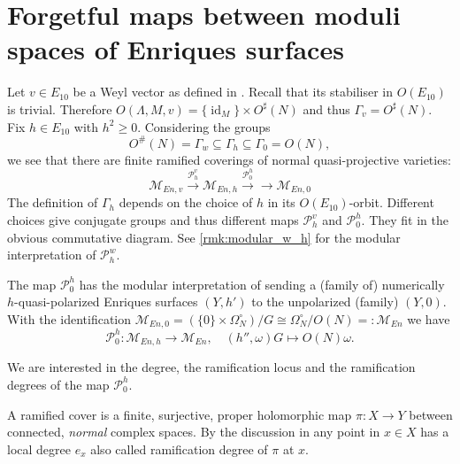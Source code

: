 \documentclass{amsart}
\theoremstyle{definition}
\theoremstyle{plain}
\DeclareMathOperator{\id}{id}
\newcommand{\M}{\mathcal{M}}
\renewcommand{\P}{\mathcal{P}}
\begin{document}
\section{Forgetful maps between moduli spaces of Enriques surfaces}\label{sect:moduli-fibrations}
Let $v \in E_{10}$ be a Weyl vector as defined in . Recall that its stabiliser in $O(E_{10})$ is trivial. Therefore $O(\Lambda,M,v)= \{\id_M\}\times O^\sharp(N)$ and thus $\Gamma_v = O^\sharp(N)$.
Fix $h \in E_{10}$ with $h^2\geq 0$. Considering the groups
\[O^\#(N)=\Gamma_w \subseteq \Gamma_h \subseteq \Gamma_0=O(N),\]
we see that there are
finite ramified coverings of normal quasi-projective varieties:
\begin{equation}
\M_{En,v} \xrightarrow{\P^v_h}\M_{En,h} \xrightarrow{\P^h_0}{\to} \M_{En,0}
\end{equation}
The definition of $\Gamma_h$ depends on the choice of $h$ in its $O(E_{10})$-orbit. Different choices give conjugate groups and thus different maps $\P^v_h$ and $\P^h_0$. They fit in the obvious commutative diagram. See \cref{rmk:modular_w_h} for the modular interpretation of $\P^w_h$.

The map $\P^h_0$ has the modular interpretation of sending a (family of) numerically $h$-quasi-polarized Enriques surfaces $(Y,h')$
to the unpolarized (family) $(Y,0)$.  With the identification $\M_{En,0}=(\{0\} \times \Omega_N^\circ)/G \cong \Omega_N^\circ/O(N)=: \M_{En}$ we have
\[\P^h_0\colon \M_{En,h} \to \M_{En}, \quad (h'',\omega)G \mapsto O(N)\omega.\]

We are interested in the degree, the ramification locus and the ramification degrees of the map $\P^h_0$.

A ramified cover is a finite, surjective, proper holomorphic map $\pi \colon X
\to Y$ between connected, \emph{normal} complex spaces.
By the discussion in \cite[Chapter I Section 16]{bhpv:compact-complex-surfaces}
any point in $x \in X$ has a local degree $e_x$ also called ramification degree of $\pi$ at $x$.
\end{document}
